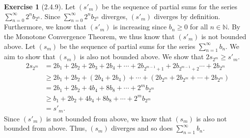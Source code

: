 \documentclass{amsart}
\theoremstyle{definition}
\newtheorem{exercise}{Exercise}
\newcommand{\N}{\mathbb{N}}
\begin{document}
\begin{exercise}[2.4.9]
  Let  $(s'_m)$ be the sequence of partial sums for the series
  $\sum_{n=0}^{\infty} 2^n b_{2^n}$. Since $\sum_{n=0}^{\infty} 2^n b_{2^n}$
  diverges, $(s'_m)$ diverges by definition. Furthermore, we know that $(s'_m)$
  is increasing since $b_n \ge 0$ for all $n \in \N$. By the Monotone
  Convergence Theorem, we thus know that $(s'_m)$ is not bounded above. Let
  $(s_m)$ be the sequence of partial sums for the series $\sum_{n=1}^{\infty}
  b_n$. We aim to show that $(s_m)$ is also not bounded above. We show that $2
  s_{2^m} \ge s'_m$.
  \begin{align*}
    2 s_{2^m} &= 2 b_1 + 2 b_2 + 2 b_3 + 2 b_4 + \cdots + 2 b_{2^{m-1}+1} + 2
    b_{2^{m-1}+2} \cdots + 2 b_{2^m} \\
    &\ge 2 b_1 + 2 b_2 + (2 b_4 + 2 b_4) + \cdots + (2 b_{2^m} + 2 b_{2^m} +
    \cdots + 2 b_{2^m}) \\
    &= 2 b_1 + 2 b_2 + 4 b_4 + 8 b_8 + \cdots + 2^m b_{2^m} \\
    &\ge b_1 + 2 b_2 + 4 b_4 + 8 b_8 + \cdots + 2^m b_{2^m} \\
    &= s'_m.
  \end{align*}
  Since $(s'_m)$ is not bounded from above, we know that $(s_m)$ is also not
  bounded from above. Thus, $(s_m)$ diverges and so does $\sum_{n=1}^{\infty}
  b_n$.
\end{exercise}
\end{document}
